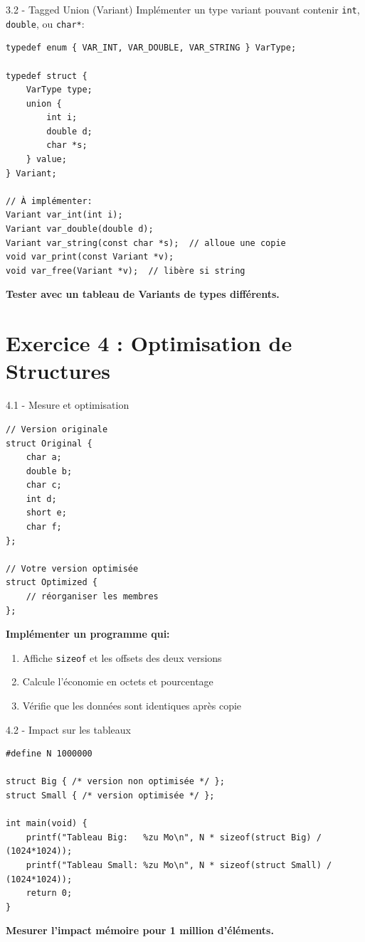 \documentclass[10pt,a4paper]{article}
\begin{document}
\begin{exercicebox}{3.2 - Tagged Union (Variant)}
Implémenter un type variant pouvant contenir \texttt{int}, \texttt{double}, ou \texttt{char*}:

\begin{lstlisting}
typedef enum { VAR_INT, VAR_DOUBLE, VAR_STRING } VarType;

typedef struct {
    VarType type;
    union {
        int i;
        double d;
        char *s;
    } value;
} Variant;

// À implémenter:
Variant var_int(int i);
Variant var_double(double d);
Variant var_string(const char *s);  // alloue une copie
void var_print(const Variant *v);
void var_free(Variant *v);  // libère si string
\end{lstlisting}

\textbf{Tester avec un tableau de Variants de types différents.}
\end{exercicebox}

\section{Exercice 4 : Optimisation de Structures}

\begin{exercicebox}{4.1 - Mesure et optimisation}
\begin{lstlisting}
// Version originale
struct Original {
    char a;
    double b;
    char c;
    int d;
    short e;
    char f;
};

// Votre version optimisée
struct Optimized {
    // réorganiser les membres
};
\end{lstlisting}

\textbf{Implémenter un programme qui:}
\begin{enumerate}
\item Affiche \texttt{sizeof} et les offsets des deux versions
\item Calcule l'économie en octets et pourcentage
\item Vérifie que les données sont identiques après copie
\end{enumerate}
\end{exercicebox}

\begin{exercicebox}{4.2 - Impact sur les tableaux}
\begin{lstlisting}
#define N 1000000

struct Big { /* version non optimisée */ };
struct Small { /* version optimisée */ };

int main(void) {
    printf("Tableau Big:   %zu Mo\n", N * sizeof(struct Big) / (1024*1024));
    printf("Tableau Small: %zu Mo\n", N * sizeof(struct Small) / (1024*1024));
    return 0;
}
\end{lstlisting}

\textbf{Mesurer l'impact mémoire pour 1 million d'éléments.}
\end{exercicebox}
\end{document}
